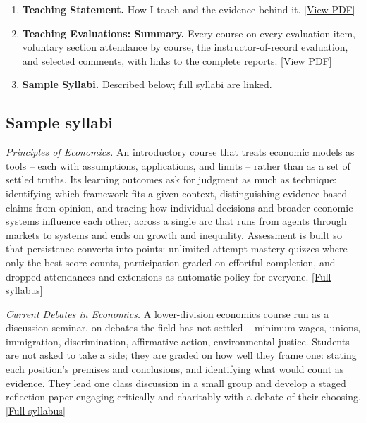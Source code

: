 \documentclass[letter,11pt]{article}
\begin{document}
\begin{enumerate}
    \item \textbf{Teaching Statement.} How I teach and the evidence behind it. \href{https://gagandeep-sachdeva.com/teaching/Teaching_Statement_Sachdeva.pdf}{[View PDF]}
    \item \textbf{Teaching Evaluations: Summary.} Every course on every evaluation item, voluntary section attendance by course, the instructor-of-record evaluation, and selected comments, with links to the complete reports. \href{https://gagandeep-sachdeva.com/teaching/Teaching_Evaluations_Summary_Sachdeva.pdf}{[View PDF]}
    \item \textbf{Sample Syllabi.} Described below; full syllabi are linked.
\end{enumerate}

\subsection*{Sample syllabi}

\textit{Principles of Economics.} An introductory course that treats economic models as tools -- each with assumptions, applications, and limits -- rather than as a set of settled truths. Its learning outcomes ask for judgment as much as technique: identifying which framework fits a given context, distinguishing evidence-based claims from opinion, and tracing how individual decisions and broader economic systems influence each other, across a single arc that runs from agents through markets to systems and ends on growth and inequality. Assessment is built so that persistence converts into points: unlimited-attempt mastery quizzes where only the best score counts, participation graded on effortful completion, and dropped attendances and extensions as automatic policy for everyone. \href{https://gagandeep-sachdeva.com/teaching/principles/Syllabus_Principles.pdf}{[Full syllabus]} %

\medskip
\textit{Current Debates in Economics.} A lower-division economics course run as a discussion seminar, on debates the field has not settled -- minimum wages, unions, immigration, discrimination, affirmative action, environmental justice. Students are not asked to take a side; they are graded on how well they frame one: stating each position's premises and conclusions, and identifying what would count as evidence. They lead one class discussion in a small group and develop a staged reflection paper engaging critically and charitably with a debate of their choosing. \href{https://gagandeep-sachdeva.com/teaching/currentdebates/Syllabus_CurrentDebates.pdf}{[Full syllabus]} %
\end{document}
